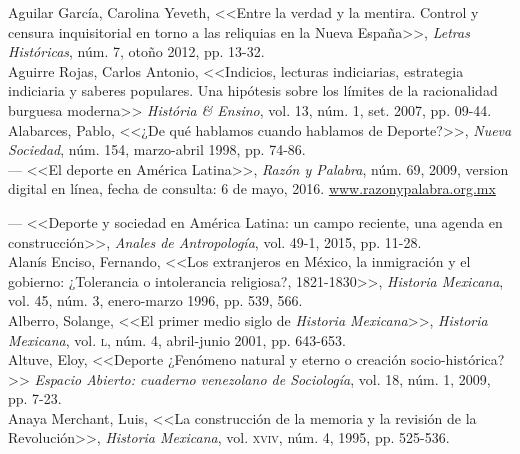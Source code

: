 \documentclass[11pt,a5paper,twoside]{book} %
\begin{document}
\begin{hangparas}{1cm}{1}

\noindent Aguilar García, Carolina Yeveth, <<Entre la verdad y la mentira. Control y censura inquisitorial en torno a las reliquias en la Nueva España>>, \emph{Letras Históricas}, núm. 7, otoño 2012, pp. 13-32. \\

\noindent Aguirre Rojas, Carlos Antonio, <<Indicios, lecturas indiciarias, estrategia indiciaria y saberes populares. Una hipótesis sobre los límites de la racionalidad burguesa moderna>> \emph{História \& Ensino}, vol. 13, núm. 1, set. 2007, pp. 09-44. \\

\noindent Alabarces, Pablo, <<¿De qué hablamos cuando hablamos de Deporte?>>, \emph{Nueva Sociedad}, núm. 154, marzo-abril 1998, pp. 74-86. \\

\noindent --- <<El deporte en América Latina>>, \emph{Razón y Palabra}, núm. 69, 2009, version digital en línea, fecha de consulta: 6 de mayo, 2016. \url{www.razonypalabra.org.mx} \\

\pagebreak

\noindent --- <<Deporte y sociedad en América Latina: un campo reciente, una agenda en construcción>>, \emph{Anales de Antropología}, vol. 49-1, 2015, pp. 11-28. \\

\noindent Alanís Enciso, Fernando, <<Los extranjeros en México, la inmigración y el gobierno:
¿Tolerancia o intolerancia religiosa?, 1821-1830>>, \emph{Historia Mexicana}, vol. 45, núm. 3, enero-marzo 1996, pp. 539, 566. \\

\noindent Alberro, Solange, <<El primer medio siglo de \emph{Historia Mexicana}>>, \emph{Historia Mexicana}, vol. \textsc{l}, núm. 4, abril-junio 2001, pp. 643-653. \\

\noindent Altuve, Eloy, <<Deporte ¿Fenómeno natural y eterno o creación socio-histórica?>> \emph{Espacio Abierto: cuaderno venezolano de Sociología}, vol. 18, núm. 1, 2009, pp. 7-23. \\

\noindent Anaya Merchant, Luis, <<La construcción de la memoria y la revisión de la Revolución>>,
\emph{Historia Mexicana}, vol. \textsc{xviv}, núm. 4, 1995, pp. 525-536. \\


\end{hangparas}
\end{document}
